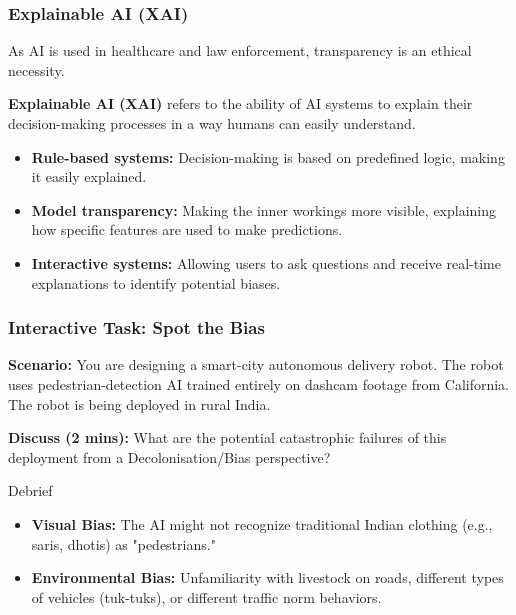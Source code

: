 \documentclass[xcolor=table]{beamer}
\begin{document}
\begin{frame}
    \frametitle{Explainable AI (XAI)}
    \small
    As AI is used in healthcare and law enforcement, transparency is an ethical necessity. 
    
    \vspace{0.2cm}
    \textbf{Explainable AI (XAI)} refers to the ability of AI systems to explain their decision-making processes in a way humans can easily understand.
    
    \begin{itemize}
        \item \textbf{Rule-based systems:} Decision-making is based on predefined logic, making it easily explained.
        \item \textbf{Model transparency:} Making the inner workings more visible, explaining how specific features are used to make predictions.
        \item \textbf{Interactive systems:} Allowing users to ask questions and receive real-time explanations to identify potential biases.
    \end{itemize}
\end{frame}

\begin{frame}
    \frametitle{Interactive Task: Spot the Bias}
    \textbf{Scenario:} You are designing a smart-city autonomous delivery robot. The robot uses pedestrian-detection AI trained entirely on dashcam footage from California. The robot is being deployed in rural India.
    
    \vspace{0.2cm}
    \textbf{Discuss (2 mins):} What are the potential catastrophic failures of this deployment from a Decolonisation/Bias perspective?
    
    \pause
    \vspace{0.2cm}
    \begin{alertblock}{Debrief}
        \begin{itemize}
            \item \textbf{Visual Bias:} The AI might not recognize traditional Indian clothing (e.g., saris, dhotis) as "pedestrians."
            \item \textbf{Environmental Bias:} Unfamiliarity with livestock on roads, different types of vehicles (tuk-tuks), or different traffic norm behaviors.
        \end{itemize}
    \end{alertblock}
\end{frame}
\end{document}
